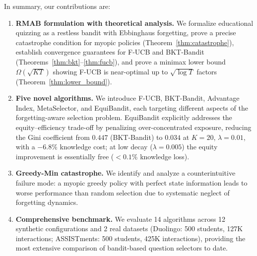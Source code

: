 In summary, our contributions are:
\begin{enumerate}[leftmargin=*,itemsep=1pt,topsep=2pt]
  \item \textbf{RMAB formulation with theoretical analysis.} We formalize educational quizzing as a restless bandit with Ebbinghaus forgetting, prove a precise catastrophe condition for myopic policies (Theorem~\ref{thm:catastrophe}), establish convergence guarantees for F-UCB and BKT-Bandit (Theorems~\ref{thm:bkt}--\ref{thm:fucb}), and prove a minimax lower bound $\Omega(\sqrt{KT})$ showing F-UCB is near-optimal up to $\sqrt{\log T}$ factors (Theorem~\ref{thm:lower_bound}).
  \item \textbf{Five novel algorithms.} We introduce F-UCB, BKT-Bandit, Advantage Index, MetaSelector, and EquiBandit, each targeting different aspects of the forgetting-aware selection problem. EquiBandit explicitly addresses the equity--efficiency trade-off by penalizing over-concentrated exposure, reducing the Gini coefficient from $0.447$ (BKT-Bandit) to $0.034$ at $K{=}20$, $\lambda{=}0.01$, with a $-6.8\%$ knowledge cost; at low decay ($\lambda{=}0.005$) the equity improvement is essentially free ($<0.1\%$ knowledge loss).
  \item \textbf{Greedy-Min catastrophe.} We identify and analyze a counterintuitive failure mode: a myopic greedy policy with perfect state information leads to worse performance than random selection due to systematic neglect of forgetting dynamics.
  \item \textbf{Comprehensive benchmark.} We evaluate 14 algorithms across 12 synthetic configurations and 2 real datasets (Duolingo: 500 students, 127K interactions; ASSISTments: 500 students, 425K interactions), providing the most extensive comparison of bandit-based question selectors to date.
\end{enumerate}

\begin{table}[t]
\centering
\caption{Comparison with prior work on bandit-based adaptive question selection.}

\label{tab:comparison}
\end{table}
